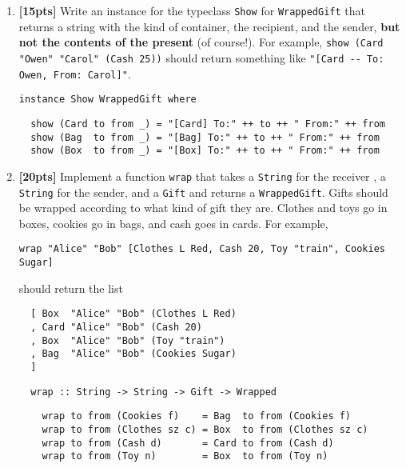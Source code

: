 \documentclass[paper=letter, fontsize=13pt]{article} %
\numberwithin{equation}{section} %
\newif\ifshowanswers\showanswerstrue
\begin{document}
\begin{enumerate}
\newpage
\item \textbf{[15pts]} Write an instance for the typeclass \verb|Show| for \verb|WrappedGift| that returns a string with the kind of container, the recipient, and the sender,
  \textbf{but not the contents of the present} (of course!).  For example, \verb|show (Card "Owen" "Carol" (Cash 25))| should return
  something like \verb|"[Card -- To: Owen, From: Carol]"|.
  
\begin{lstlisting}
instance Show WrappedGift where
\end{lstlisting}
  \ifshowanswers
  \begin{verbatim}
  show (Card to from _) = "[Card] To:" ++ to ++ " From:" ++ from
  show (Bag  to from _) = "[Bag] To:" ++ to ++ " From:" ++ from
  show (Box  to from _) = "[Box] To:" ++ to ++ " From:" ++ from
 \end{verbatim}
  \else
  \framebox[0.9\textwidth]{\begin{minipage}[t][30em]{0.9\textwidth} \end{minipage}}
  \fi

\newpage
\newpage

\item \textbf{[20pts]}
  Implement a function \verb|wrap| that takes a \verb|String| for the receiver , a \verb|String| for the sender, and a \verb|Gift| and returns a \verb|WrappedGift|.
  Gifts should be wrapped according to what kind of gift they are. Clothes and toys go in boxes, cookies go in bags, and cash goes in cards. For example,

  \verb|wrap "Alice" "Bob" [Clothes L Red, Cash 20, Toy "train", Cookies Sugar]|

  should return the list

\begin{verbatim}
  [ Box  "Alice" "Bob" (Clothes L Red)
  , Card "Alice" "Bob" (Cash 20)
  , Box  "Alice" "Bob" (Toy "train")
  , Bag  "Alice" "Bob" (Cookies Sugar)
  ]
\end{verbatim}
  
\begin{lstlisting}
  wrap :: String -> String -> Gift -> Wrapped
\end{lstlisting}
  \ifshowanswers
  \begin{verbatim}
    wrap to from (Cookies f)    = Bag  to from (Cookies f)
    wrap to from (Clothes sz c) = Box  to from (Clothes sz c)
    wrap to from (Cash d)       = Card to from (Cash d)
    wrap to from (Toy n)        = Box  to from (Toy n)
 \end{verbatim}
  \else
  \framebox[0.9\textwidth]{\begin{minipage}[t][35em]{0.9\textwidth} \end{minipage}}
  \fi


\end{enumerate}
\end{document}
